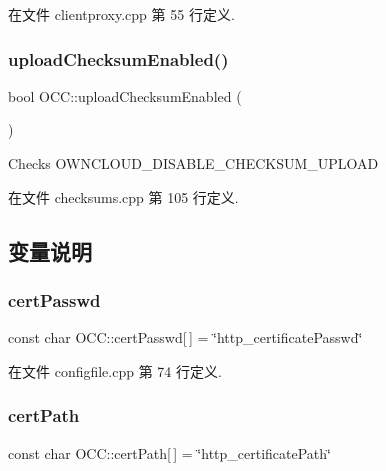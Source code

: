 在文件 clientproxy.\+cpp 第 55 行定义.

\mbox{\label{namespace_o_c_c_aa7010e2fa7bcdda9e53981df6d8efb3c}} 
\subsubsection{\texorpdfstring{upload\+Checksum\+Enabled()}{uploadChecksumEnabled()}}
{\footnotesize\ttfamily bool O\+C\+C\+::upload\+Checksum\+Enabled (\begin{DoxyParamCaption}{ }\end{DoxyParamCaption})}



Checks O\+W\+N\+C\+L\+O\+U\+D\+\_\+\+D\+I\+S\+A\+B\+L\+E\+\_\+\+C\+H\+E\+C\+K\+S\+U\+M\+\_\+\+U\+P\+L\+O\+AD 



在文件 checksums.\+cpp 第 105 行定义.



\subsection{变量说明}
\mbox{\label{namespace_o_c_c_a3073897f93271e18b6cf6cfdc14f6182}} 
\subsubsection{\texorpdfstring{cert\+Passwd}{certPasswd}}
{\footnotesize\ttfamily const char O\+C\+C\+::cert\+Passwd\mbox{[}$\,$\mbox{]} = \char`\"{}http\+\_\+certificate\+Passwd\char`\"{}}



在文件 configfile.\+cpp 第 74 行定义.

\mbox{\label{namespace_o_c_c_a04729ffc872e281833cebe2466f2ed85}} 
\subsubsection{\texorpdfstring{cert\+Path}{certPath}}
{\footnotesize\ttfamily const char O\+C\+C\+::cert\+Path\mbox{[}$\,$\mbox{]} = \char`\"{}http\+\_\+certificate\+Path\char`\"{}}



